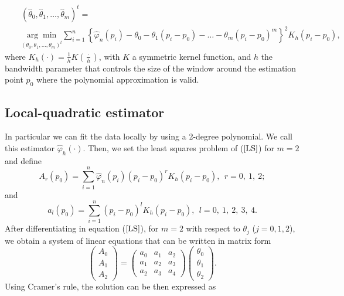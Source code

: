 \documentclass[preprint,12pt]{elsarticle}
\begin{document}
\begin{eqnarray}\label{LS}
&&\left(\widehat{\theta}_0,\widehat{\theta}_1,\ldots,\widehat{\theta}_m\right)^t= \\
\nonumber &&\underset{\left({\theta}_0,\theta_1,\ldots, {\theta}_m\right)^t}{\arg \min} \sum_{i=1}^n\left\{\widehat{\varphi}_n(p_i)-\theta_0-\theta_1(p_i-p_0)-\ldots-\theta_m(p_i-p_0)^m\right\}^2 K_h(p_i-p_0),
\end{eqnarray}
where $K_h(\cdot)=\frac{1}{h}K(\frac{\cdot}{h})$, with $K$ a symmetric kernel function, and $h$ the bandwidth parameter that controls the size of the window around the estimation point $p_0$ where the polynomial approximation is valid.

\subsection{Local-quadratic estimator}
In particular we can fit the data locally by using a 2-degree polynomial. We call this estimator $\widehat{\varphi}_h(\cdot)$. Then, we set the least squares problem of ($\ref{LS}$) for $m=2$ and define 
\[
A_r(p_0)=\sum_{i=1}^n\widehat{\varphi}_n(p_i)(p_i-p_0)^r K_h(p_i-p_0), \ \ r=0, \ 1, \ 2;
\]
and 
\[
a_l(p_0)=\sum_{i=1}^n(p_i-p_0)^l K_h(p_i-p_0), \ \ l=0,\ 1, \ 2, \ 3, \ 4.
\]
After differentiating in equation ($\ref{LS}$), for $m=2$ with respect to $\theta_j$ ($j=0, 1, 2$), we obtain a system of linear equations that can be written in matrix form
\[
\left(\begin{array}{c} 
A_0 \\ 
A_1 \\ 
A_2
 \end{array}\right)
=\left(\begin{array}{ccc}
a_0 & a_1 &a_2 \\ 
a_1 & a_2 &a_3 \\ 
a_2 & a_3 &a_4 
\end{array}\right)
\left(\begin{array}{c}
 \theta_0 \\ 
\theta_1 \\ 
\theta_2
 \end{array}\right).
\]
Using  Cramer's rule, the solution can be then expressed as
\end{document}

